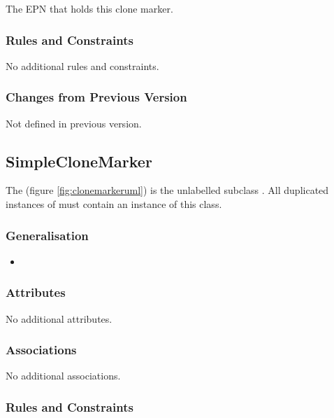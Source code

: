 \begin{attributes}
 The EPN that holds this
clone marker.
\end{attributes}

\subsubsection{Rules and Constraints}

No additional rules and constraints.

\subsubsection{Changes from Previous Version}

Not defined in previous version.

\subsection{SimpleCloneMarker}

The  (figure \ref{fig:clonemarkeruml}) is
the unlabelled subclass . All duplicated
instances of  must contain an instance of this
class.

\subsubsection{Generalisation}

\begin{itemize}
\item {}
\end{itemize}

\subsubsection{Attributes}

No additional attributes.

\subsubsection{Associations}

No additional associations.

\subsubsection{Rules and Constraints}

